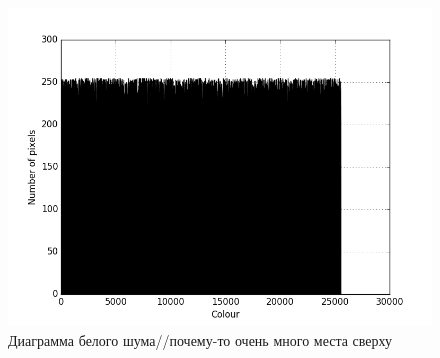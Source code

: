\begin{figure}[h]
	\centering
    \includegraphics[width=\textwidth]{img/2_white_noise.png}
	\caption{Диаграмма белого шума//почему-то очень много места сверху}
	\label{fig:spire05}
\end{figure}

